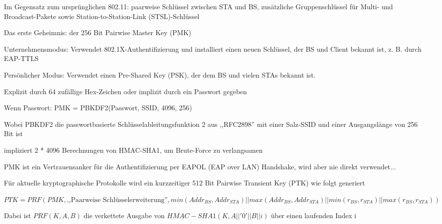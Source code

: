 \documentclass[a4paper]{article}
\begin{document}
\begin{multicols}{3}
      \begin{itemize*}
            \item Im Gegensatz zum ursprünglichen 802.11: paarweise Schlüssel zwischen
            STA und BS, zusätzliche Gruppenschlüssel für Multi- und
            Broadcast-Pakete sowie Station-to-Station-Link (STSL)-Schlüssel
            \item Das erste Geheimnis: der 256 Bit Pairwise Master Key (PMK)
            \begin{itemize*}
                  \item Unternehmensmodus: Verwendet 802.1X-Authentifizierung und installiert einen neuen Schlüssel, der BS und Client bekannt ist, z. B. durch EAP-TTLS
                  \item Persönlicher Modus: Verwendet einen Pre-Shared Key (PSK), der dem BS und vielen STAs bekannt ist.
                  \begin{itemize*}
                        \item Explizit durch 64 zufällige Hex-Zeichen oder implizit durch ein Passwort gegeben
                        \item Wenn Passwort: PMK = PBKDF2(Passwort, SSID, 4096, 256)
                        \item Wobei PBKDF2 die passwortbasierte Schlüsselableitungsfunktion 2 aus ,,RFC2898'' mit einer Salz-SSID und einer Ausgangslänge von 256 Bit ist
                        \item impliziert 2 * 4096 Berechnungen von HMAC-SHA1, um Brute-Force zu verlangsamen
                  \end{itemize*}
            \end{itemize*}
            \item PMK ist ein Vertrauensanker für die Authentifizierung per EAPOL (EAP over LAN) Handshake, wird aber nie direkt verwendet...
            \item Für aktuelle kryptographische Protokolle wird ein kurzzeitiger 512 Bit
            Pairwise Transient Key (PTK) wie folgt generiert
            \begin{itemize*}
                  \item $PTK = PRF(PMK, \text{,,Paarweise Schlüsselerweiterung''}, min(Addr_{BS}, Addr_{STA}) || max(Addr_{BS}, Addr_{STA}) || min(r_{BS}, r_{STA}) || max(r_{BS}, r_{STA}))$
                  \item Dabei ist $PRF(K, A, B)$ die verkettete Ausgabe von $HMAC-SHA1(K, A || '0' || B || i)$ über einen laufenden Index i
            \end{itemize*}

\end{itemize*}
\end{multicols}
\end{document}
